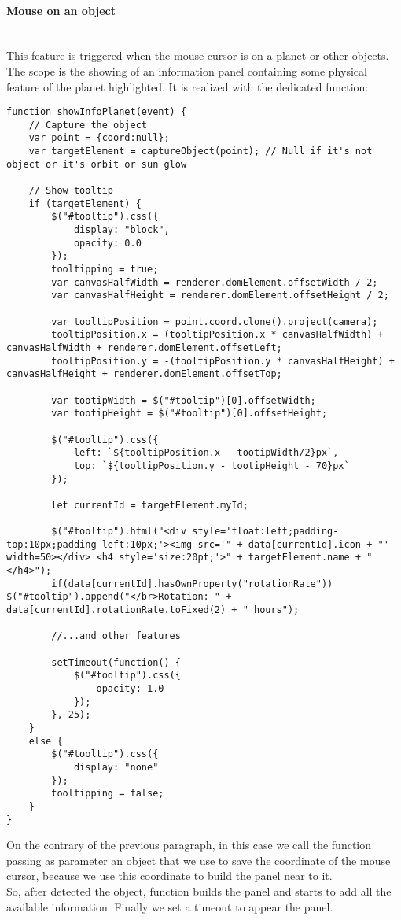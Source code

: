 \documentclass{article}
\begin{document}
\paragraph{Mouse on an object}\mbox{}\\
This feature is triggered when the mouse cursor is on a planet or other objects. The scope is the showing of an information panel containing some physical feature of the planet highlighted. It is realized with the dedicated function:
\begin{lstlisting}
function showInfoPlanet(event) {
	// Capture the object
	var point = {coord:null};
	var targetElement = captureObject(point); // Null if it's not object or it's orbit or sun glow
	
	// Show tooltip
	if (targetElement) {
		$("#tooltip").css({
			display: "block",
			opacity: 0.0
		});
		tooltipping = true;
		var canvasHalfWidth = renderer.domElement.offsetWidth / 2;
		var canvasHalfHeight = renderer.domElement.offsetHeight / 2;
		
		var tooltipPosition = point.coord.clone().project(camera);
		tooltipPosition.x = (tooltipPosition.x * canvasHalfWidth) + canvasHalfWidth + renderer.domElement.offsetLeft;
		tooltipPosition.y = -(tooltipPosition.y * canvasHalfHeight) + canvasHalfHeight + renderer.domElement.offsetTop;
		
		var tootipWidth = $("#tooltip")[0].offsetWidth;
		var tootipHeight = $("#tooltip")[0].offsetHeight;
		
		$("#tooltip").css({
			left: `${tooltipPosition.x - tootipWidth/2}px`,
			top: `${tooltipPosition.y - tootipHeight - 70}px`
		});
		
		let currentId = targetElement.myId;
		
		$("#tooltip").html("<div style='float:left;padding-top:10px;padding-left:10px;'><img src='" + data[currentId].icon + "' width=50></div> <h4 style='size:20pt;'>" + targetElement.name + "</h4>");
		if(data[currentId].hasOwnProperty("rotationRate")) $("#tooltip").append("</br>Rotation: " + data[currentId].rotationRate.toFixed(2) + " hours");
		
		//...and other features
		
		setTimeout(function() {
			$("#tooltip").css({
				opacity: 1.0
			});
		}, 25);
	}
	else {
		$("#tooltip").css({
			display: "none"
		});
		tooltipping = false;
	}
}
\end{lstlisting}
On the contrary of the previous paragraph, in this case we call the function passing as parameter an object that we use to save the coordinate of the mouse cursor, because we use this coordinate to build the panel near to it.\\
So, after detected the object, function builds the panel and starts to add all the available information. Finally we set a timeout to appear the panel.
\end{document}
